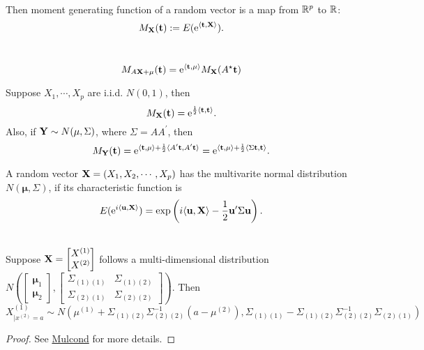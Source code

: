 \documentclass[12pt]{book}
\begin{document}
\begin{definition} \ \\
Then moment generating function of a random vector is a map from $\mathbb{R}^p$ to $\mathbb{R}$:
$$
M_{\mathbf{X}}(\mathbf{t}):=E(\mathrm{e}^{{\langle \mathbf t,\mathbf{X}\rangle}}).
$$
\end{definition}

\begin{theorem} \ \\
$$
M_{A\mathbf{X}+\mathbf{\mu}}(\mathbf t)=\mathrm{e}^{{\langle \mathbf t,\mathbf \mu\rangle}}M_{\mathbf{X}}(A^\star \mathbf t)
$$
\end{theorem}

\begin{definition}
Suppose $X_1,\cdots,X_p$ are i.i.d. $N(0,1)$, then 
$$
M_{\mathbf{X}}(\mathbf t) = \mathrm{e}^{\frac{1}{2}{\langle \mathbf t,\mathbf t\rangle}}.
$$	
Also, if $\mathbf{Y} \sim N(\mathbf \mu,\Sigma)$, where $\Sigma = AA^\prime$, then 
$$
M_{\mathbf{Y}}(\mathbf t) = \mathrm{e}^{{\langle \mathbf t,\mathbf \mu\rangle}+\frac{1}{2}{\langle A^\prime \mathbf t,A^\prime \mathbf t\rangle}}=\mathrm{e}^{{\langle \mathbf t,\mathbf \mu\rangle}+\frac{1}{2}{\langle \Sigma \mathbf t, \mathbf t\rangle}}.
$$
\end{definition}



\begin{definition}
A random vector $\mathbf{X} = (X_1,X_2,\cdots,X_p)$ has the multivarite normal distribution $N(\mathbf{\mu}, \Sigma)$, if its characteristic function is 
$$
E(\mathrm{e}^{i{\langle \mathbf{u},\mathbf{X}\rangle}}) = \mathrm{exp} \left( i{\langle \mathbf{u},\mathbf{X}\rangle} - \frac{1}{2} \mathbf{u}^\prime \Sigma \mathbf{u}\right).
$$
\end{definition}

\begin{theorem} \ \\
Suppose $\mathbf{X} = \begin{bmatrix}
	X^{(1)} \\
	X^{(2)}
\end{bmatrix}$ follows a multi-dimensional distribution $N(\begin{bmatrix}
	\mathbf \mu_1 \\
	\mathbf \mu_2 
\end{bmatrix} , \begin{bmatrix}
	\Sigma_{(1)(1)} & \Sigma_{(1)(2)} \\
	\Sigma_{(2)(1)} & \Sigma_{(2)(2)}
\end{bmatrix})$.
Then $X^{(1)}_{|x^{(2)}=a} \sim N(\mu^{(1)}+\Sigma_{(1)(2)}\Sigma_{(2)(2)}^{-1}(a-\mu^{(2)}),\Sigma_{(1)(1)}-\Sigma_{(1)(2)}\Sigma_{(2)(2)}^{-1}\Sigma_{(2)(1)})$	
\end{theorem}
\begin{proof}
See \href{https://statproofbook.github.io/P/mvn-cond}{Mulcond} for more details.
\end{proof}
\end{document}

